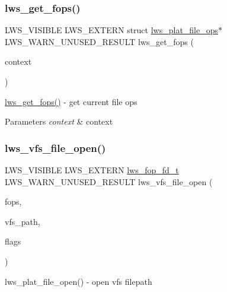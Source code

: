 \subsubsection{\texorpdfstring{lws\+\_\+get\+\_\+fops()}{lws\_get\_fops()}}
{\footnotesize\ttfamily L\+W\+S\+\_\+\+V\+I\+S\+I\+B\+LE L\+W\+S\+\_\+\+E\+X\+T\+E\+RN struct \hyperlink{structlws__plat__file__ops}{lws\+\_\+plat\+\_\+file\+\_\+ops}$\ast$ L\+W\+S\+\_\+\+W\+A\+R\+N\+\_\+\+U\+N\+U\+S\+E\+D\+\_\+\+R\+E\+S\+U\+LT lws\+\_\+get\+\_\+fops (\begin{DoxyParamCaption}\item[{struct \hyperlink{structlws__context}{lws\+\_\+context} $\ast$}]{context }\end{DoxyParamCaption})}

\hyperlink{group__fops_gac08aef64c4c34647ed699b24759b6b0e}{lws\+\_\+get\+\_\+fops()} -\/ get current file ops


\begin{DoxyParams}{Parameters}
{\em context} & context \\
\hline
\end{DoxyParams}
\mbox{\label{group__fops_gafde9d62b0140a9127129c76f6817e010}} 
\subsubsection{\texorpdfstring{lws\+\_\+vfs\+\_\+file\+\_\+open()}{lws\_vfs\_file\_open()}}
{\footnotesize\ttfamily L\+W\+S\+\_\+\+V\+I\+S\+I\+B\+LE L\+W\+S\+\_\+\+E\+X\+T\+E\+RN \hyperlink{structlws__fop__fd}{lws\+\_\+fop\+\_\+fd\+\_\+t} L\+W\+S\+\_\+\+W\+A\+R\+N\+\_\+\+U\+N\+U\+S\+E\+D\+\_\+\+R\+E\+S\+U\+LT lws\+\_\+vfs\+\_\+file\+\_\+open (\begin{DoxyParamCaption}\item[{const struct \hyperlink{structlws__plat__file__ops}{lws\+\_\+plat\+\_\+file\+\_\+ops} $\ast$}]{fops,  }\item[{const char $\ast$}]{vfs\+\_\+path,  }\item[{lws\+\_\+fop\+\_\+flags\+\_\+t $\ast$}]{flags }\end{DoxyParamCaption})}

lws\+\_\+plat\+\_\+file\+\_\+open() -\/ open vfs filepath


